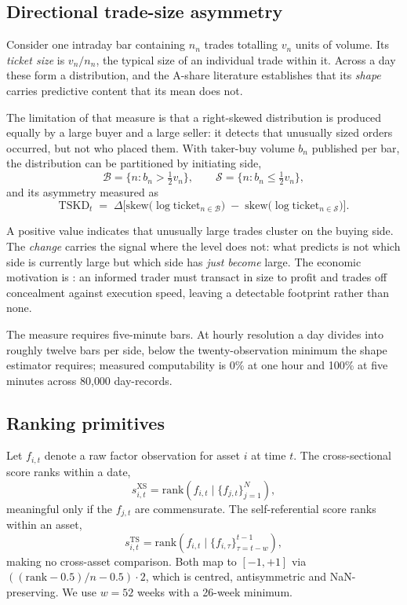 \documentclass[11pt,letterpaper]{article}
\begin{document}
\subsection{Directional trade-size asymmetry}
\label{sec:tskd}

Consider one intraday bar containing $n_n$ trades totalling $v_n$ units of
volume. Its \emph{ticket size} is $v_n/n_n$, the typical size of an individual
trade within it. Across a day these form a distribution, and the A-share
literature establishes that its \emph{shape} carries predictive content that its
mean does not.

The limitation of that measure is that a right-skewed distribution is produced
equally by a large buyer and a large seller: it detects that unusually sized
orders occurred, but not who placed them. With taker-buy volume $b_n$ published
per bar, the distribution can be partitioned by initiating side,
\[
\mathcal{B} = \{n : b_n > \tfrac{1}{2}v_n\}, \qquad
\mathcal{S} = \{n : b_n \le \tfrac{1}{2}v_n\},
\]
and its asymmetry measured as
\[
\mathrm{TSKD}_t \;=\; \Delta\Big[\mathrm{skew}\big(\log \mathrm{ticket}_{n\in\mathcal{B}}\big)
\;-\; \mathrm{skew}\big(\log \mathrm{ticket}_{n\in\mathcal{S}}\big)\Big].
\]

A positive value indicates that unusually large trades cluster on the buying
side. The \emph{change} carries the signal where the level does not: what
predicts is not which side is currently large but which side has \emph{just
become} large. The economic motivation is \citet{kyle1985}: an informed trader
must transact in size to profit and trades off concealment against execution
speed, leaving a detectable footprint rather than none.

The measure requires five-minute bars. At hourly resolution a day divides into
roughly twelve bars per side, below the twenty-observation minimum the shape
estimator requires; measured computability is 0\% at one hour and 100\% at five
minutes across 80{,}000 day-records.

\subsection{Ranking primitives}

Let $f_{i,t}$ denote a raw factor observation for asset $i$ at time $t$. The
cross-sectional score ranks within a date,
\[
s^{\mathrm{XS}}_{i,t} = \mathrm{rank}\!\left(f_{i,t} \mid \{f_{j,t}\}_{j=1}^{N}\right),
\]
meaningful only if the $f_{j,t}$ are commensurate. The self-referential score
ranks within an asset,
\[
s^{\mathrm{TS}}_{i,t} = \mathrm{rank}\!\left(f_{i,t} \mid \{f_{i,\tau}\}_{\tau=t-w}^{t-1}\right),
\]
making no cross-asset comparison. Both map to $[-1,+1]$ via
$((\mathrm{rank}-0.5)/n - 0.5)\cdot 2$, which is centred, antisymmetric and
NaN-preserving. We use $w=52$ weeks with a 26-week minimum.
\end{document}
